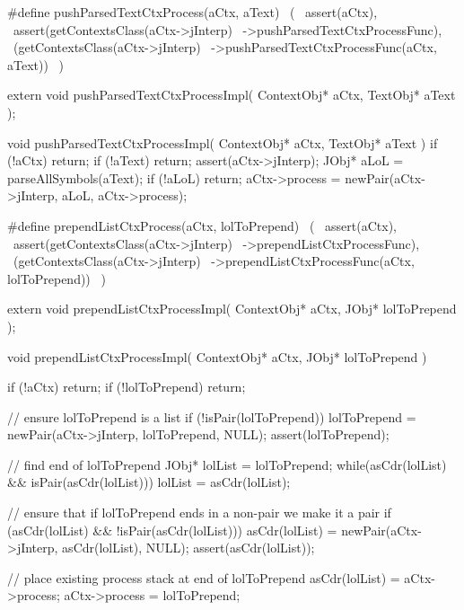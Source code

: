 \startCHeader
#define pushParsedTextCtxProcess(aCtx, aText)      \
  (                                                \
    assert(aCtx),                                  \
    assert(getContextsClass(aCtx->jInterp)         \
      ->pushParsedTextCtxProcessFunc),             \
    (getContextsClass(aCtx->jInterp)               \
      ->pushParsedTextCtxProcessFunc(aCtx, aText)) \
  )
\stopCHeader

\setCHeaderStream{private}
\startCHeader
extern void pushParsedTextCtxProcessImpl(
  ContextObj* aCtx,
  TextObj* aText
);
\stopCHeader
\setCHeaderStream{public}

\startCCode
void pushParsedTextCtxProcessImpl(
  ContextObj* aCtx,
  TextObj* aText
) {
  if (!aCtx) return;
  if (!aText) return;
  assert(aCtx->jInterp);
  JObj* aLoL = parseAllSymbols(aText);
  if (!aLoL) return;
  aCtx->process = newPair(aCtx->jInterp, aLoL, aCtx->process);
}
\stopCCode

\startCHeader
#define prependListCtxProcess(aCtx, lolToPrepend)      \
  (                                                    \
    assert(aCtx),                                      \
    assert(getContextsClass(aCtx->jInterp)             \
      ->prependListCtxProcessFunc),                    \
    (getContextsClass(aCtx->jInterp)                   \
      ->prependListCtxProcessFunc(aCtx, lolToPrepend)) \
  )
\stopCHeader

\startCHeader
extern void prependListCtxProcessImpl(
  ContextObj* aCtx,
  JObj* lolToPrepend
);
\stopCHeader
\setCHeaderStream{public}

\startCCode
void prependListCtxProcessImpl(
  ContextObj* aCtx,
  JObj* lolToPrepend
) {
  if (!aCtx) return;
  if (!lolToPrepend) return;

  // ensure lolToPrepend is a list
  if (!isPair(lolToPrepend)) {
    lolToPrepend = newPair(aCtx->jInterp, lolToPrepend, NULL);
    assert(lolToPrepend);
  }

  // find end of lolToPrepend
  JObj* lolList = lolToPrepend;
  while(asCdr(lolList) && isPair(asCdr(lolList))) {
    lolList = asCdr(lolList);
  }

  // ensure that if lolToPrepend ends in a non-pair we make it a pair
  if (asCdr(lolList) && !isPair(asCdr(lolList))) {
    asCdr(lolList) = newPair(aCtx->jInterp, asCdr(lolList), NULL);
    assert(asCdr(lolList));
  }

  // place existing process stack at end of lolToPrepend
  asCdr(lolList)  = aCtx->process;
  aCtx->process   = lolToPrepend;
}
\stopCCode

